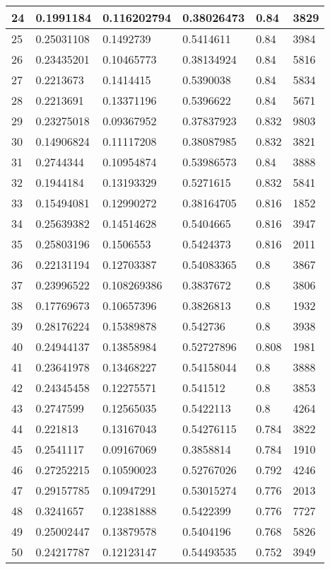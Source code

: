 \begin{longtable}{|l|l|l|l|l|l|}
24 & 0.1991184 & 0.116202794 & 0.38026473 & 0.84 & 3829 \\ \hline 
25 & 0.25031108 & 0.1492739 & 0.5414611 & 0.84 & 3984 \\ \hline 
26 & 0.23435201 & 0.10465773 & 0.38134924 & 0.84 & 5816 \\ \hline 
27 & 0.2213673 & 0.1414415 & 0.5390038 & 0.84 & 5834 \\ \hline 
28 & 0.2213691 & 0.13371196 & 0.5396622 & 0.84 & 5671 \\ \hline 
29 & 0.23275018 & 0.09367952 & 0.37837923 & 0.832 & 9803 \\ \hline 
30 & 0.14906824 & 0.11117208 & 0.38087985 & 0.832 & 3821 \\ \hline 
31 & 0.2744344 & 0.10954874 & 0.53986573 & 0.84 & 3888 \\ \hline 
32 & 0.1944184 & 0.13193329 & 0.5271615 & 0.832 & 5841 \\ \hline 
33 & 0.15494081 & 0.12990272 & 0.38164705 & 0.816 & 1852 \\ \hline 
34 & 0.25639382 & 0.14514628 & 0.5404665 & 0.816 & 3947 \\ \hline 
35 & 0.25803196 & 0.1506553 & 0.5424373 & 0.816 & 2011 \\ \hline 
36 & 0.22131194 & 0.12703387 & 0.54083365 & 0.8 & 3867 \\ \hline 
37 & 0.23996522 & 0.108269386 & 0.3837672 & 0.8 & 3806 \\ \hline 
38 & 0.17769673 & 0.10657396 & 0.3826813 & 0.8 & 1932 \\ \hline 
39 & 0.28176224 & 0.15389878 & 0.542736 & 0.8 & 3938 \\ \hline 
40 & 0.24944137 & 0.13858984 & 0.52727896 & 0.808 & 1981 \\ \hline 
41 & 0.23641978 & 0.13468227 & 0.54158044 & 0.8 & 3888 \\ \hline 
42 & 0.24345458 & 0.12275571 & 0.541512 & 0.8 & 3853 \\ \hline 
43 & 0.2747599 & 0.12565035 & 0.5422113 & 0.8 & 4264 \\ \hline 
44 & 0.221813 & 0.13167043 & 0.54276115 & 0.784 & 3822 \\ \hline 
45 & 0.2541117 & 0.09167069 & 0.3858814 & 0.784 & 1910 \\ \hline 
46 & 0.27252215 & 0.10590023 & 0.52767026 & 0.792 & 4246 \\ \hline 
47 & 0.29157785 & 0.10947291 & 0.53015274 & 0.776 & 2013 \\ \hline 
48 & 0.3241657 & 0.12381888 & 0.5422399 & 0.776 & 7727 \\ \hline 
49 & 0.25002447 & 0.13879578 & 0.5404196 & 0.768 & 5826 \\ \hline 
50 & 0.24217787 & 0.12123147 & 0.54493535 & 0.752 & 3949 \\ \hline 
\end{longtable}